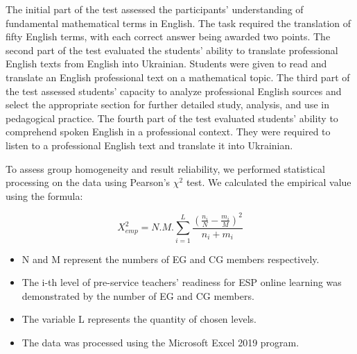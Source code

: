 The initial part of the test assessed the participants' understanding of
fundamental mathematical terms in English. The task required the
translation of fifty English terms, with each correct answer being
awarded two points. The second part of the test evaluated the students'
ability to translate professional English texts from English into
Ukrainian. Students were given to read and translate an English
professional text on a mathematical topic. The third part of the test
assessed students' capacity to analyze professional English sources and
select the appropriate section for further detailed study, analysis, and
use in pedagogical practice. The fourth part of the test evaluated
students' ability to comprehend spoken English in a professional
context. They were required to listen to a professional English text and
translate it into Ukrainian.

To assess group homogeneity and result reliability, we performed
statistical processing on the data using Pearson's $\chi^2$ test.
We calculated the empirical value using the formula:

\begin{equation}\label{eq-01}
X^{2}_{emp} = N . M . \sum_{i=1}^{L}\frac{ (\frac{n_{i}}{N}-\frac{m_{i}}{M})^{2}}{n_{i}+m_{i}}
\end{equation}
 

\begin{itemize}
    \item N and M represent the numbers of EG and CG members respectively.
    \item The i-th level of pre-service teachers' readiness for ESP online
learning was demonstrated by the number of EG and CG members.
    \item The variable L represents the quantity of chosen levels. 
    \item The data was processed using the Microsoft Excel 2019 program.
\end{itemize}
